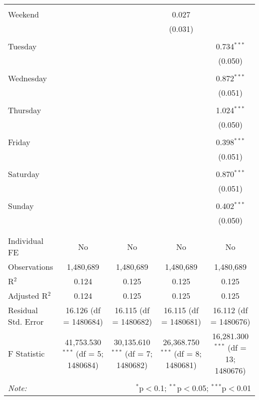 \documentclass[
]{article}
\begin{document}
\begin{table}[!htbp]
{\begin{tabular}{@{\extracolsep{5pt}}lcccc}
  & & & & \\ 
 Weekend &  &  & 0.027 &  \\ 
  &  &  & (0.031) &  \\ 
  & & & & \\ 
 Tuesday &  &  &  & 0.734$^{***}$ \\ 
  &  &  &  & (0.050) \\ 
  & & & & \\ 
 Wednesday &  &  &  & 0.872$^{***}$ \\ 
  &  &  &  & (0.051) \\ 
  & & & & \\ 
 Thursday &  &  &  & 1.024$^{***}$ \\ 
  &  &  &  & (0.050) \\ 
  & & & & \\ 
 Friday &  &  &  & 0.398$^{***}$ \\ 
  &  &  &  & (0.051) \\ 
  & & & & \\ 
 Saturday &  &  &  & 0.870$^{***}$ \\ 
  &  &  &  & (0.051) \\ 
  & & & & \\ 
 Sunday &  &  &  & 0.402$^{***}$ \\ 
  &  &  &  & (0.050) \\ 
  & & & & \\ 
\hline \\[-1.8ex] 
Individual FE & No & No & No & No \\ 
Observations & 1,480,689 & 1,480,689 & 1,480,689 & 1,480,689 \\ 
R$^{2}$ & 0.124 & 0.125 & 0.125 & 0.125 \\ 
Adjusted R$^{2}$ & 0.124 & 0.125 & 0.125 & 0.125 \\ 
Residual Std. Error & 16.126 (df = 1480684) & 16.115 (df = 1480682) & 16.115 (df = 1480681) & 16.112 (df = 1480676) \\ 
F Statistic & 41,753.530$^{***}$ (df = 5; 1480684) & 30,135.610$^{***}$ (df = 7; 1480682) & 26,368.750$^{***}$ (df = 8; 1480681) & 16,281.300$^{***}$ (df = 13; 1480676) \\ 
\hline 
\hline \\[-1.8ex] 
\textit{Note:}  & \multicolumn{4}{r}{$^{*}$p$<$0.1; $^{**}$p$<$0.05; $^{***}$p$<$0.01} \\ 
\end{tabular}
} 
\end{table} 
\newpage
\end{document}
